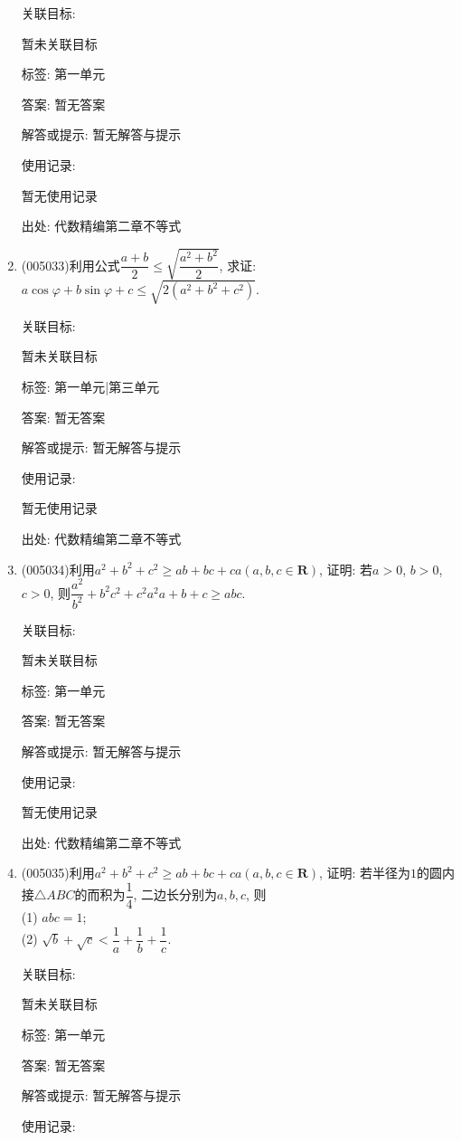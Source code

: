 \documentclass[10pt,a4paper]{article}
\begin{document}
\begin{enumerate}[1.]
关联目标:

暂未关联目标



标签: 第一单元

答案: 暂无答案

解答或提示: 暂无解答与提示

使用记录:

暂无使用记录


出处: 代数精编第二章不等式
\item { (005033)}利用公式$\dfrac{a+b}2\le \sqrt{\dfrac{a^2+b^2}2}$, 求证: $a\cos \varphi +b\sin \varphi +c\le \sqrt{2(a^2+b^2+c^2)}$.


关联目标:

暂未关联目标



标签: 第一单元|第三单元

答案: 暂无答案

解答或提示: 暂无解答与提示

使用记录:

暂无使用记录


出处: 代数精编第二章不等式
\item { (005034)}利用$a^2+b^2+c^2\ge ab+bc+ca(a,b,c\in \mathbf{R})$, 证明: 若$a>0$, $b>0$, $c>0$, 则$\dfrac{a^2}{b^2}+{b^2}{c^2}+{c^2}{a^2}{a+b+c}\ge abc$.


关联目标:

暂未关联目标



标签: 第一单元

答案: 暂无答案

解答或提示: 暂无解答与提示

使用记录:

暂无使用记录


出处: 代数精编第二章不等式
\item { (005035)}利用$a^2+b^2+c^2\ge ab+bc+ca(a,b,c\in \mathbf{R})$, 证明: 若半径为$1$的圆内接$\triangle ABC$的而积为$\dfrac 14$, 二边长分别为$a,b,c$, 则\\(1) $abc=1$;\\
(2) $\sqrt b+\sqrt c<\dfrac 1a+\dfrac 1b+\dfrac 1c$.


关联目标:

暂未关联目标



标签: 第一单元

答案: 暂无答案

解答或提示: 暂无解答与提示

使用记录:


\end{enumerate}
\end{document}
